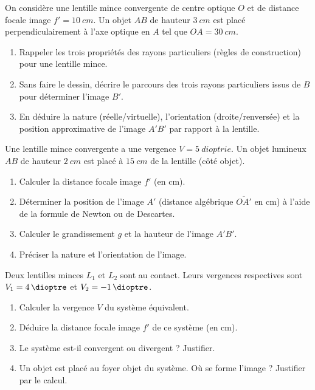 \documentclass[11pt]{article}
\begin{document}
\begin{exercice}
On considère une lentille mince convergente de centre optique $O$ et de distance focale image $f' = \SI{10}{cm}$. Un objet $AB$ de hauteur $\SI{3}{cm}$ est placé perpendiculairement à l'axe optique en $A$ tel que $OA = \SI{30}{cm}$.
\begin{enumerate}
    \item Rappeler les trois propriétés des rayons particuliers (règles de construction) pour une lentille mince.
    \item Sans faire le dessin, décrire le parcours des trois rayons particuliers issus de $B$ pour déterminer l'image $B'$.
    \item En déduire la nature (réelle/virtuelle), l'orientation (droite/renversée) et la position approximative de l'image $A'B'$ par rapport à la lentille.
\end{enumerate}
\end{exercice}

\begin{exercice}
Une lentille mince convergente a une vergence $V = \SI{5}{dioptrie}$. Un objet lumineux $AB$ de hauteur $\SI{2}{cm}$ est placé à $\SI{15}{cm}$ de la lentille (côté objet).
\begin{enumerate}
    \item Calculer la distance focale image $f'$ (en cm).
    \item Déterminer la position de l'image $A'$ (distance algébrique $\overline{OA'}$ en cm) à l'aide de la formule de Newton ou de Descartes.
    \item Calculer le grandissement $g$ et la hauteur de l'image $A'B'$.
    \item Préciser la nature et l'orientation de l'image.
\end{enumerate}
\end{exercice}

\begin{exercice}
Deux lentilles minces $L_1$ et $L_2$ sont au contact. Leurs vergences respectives sont $V_1 = \SI{4}{\dioptre}$ et $V_2 = -\SI{1}{\dioptre}$.
\begin{enumerate}
    \item Calculer la vergence $V$ du système équivalent.
    \item Déduire la distance focale image $f'$ de ce système (en cm).
    \item Le système est-il convergent ou divergent ? Justifier.
    \item Un objet est placé au foyer objet du système. Où se forme l'image ? Justifier par le calcul.
\end{enumerate}
\end{exercice}
\end{document}
